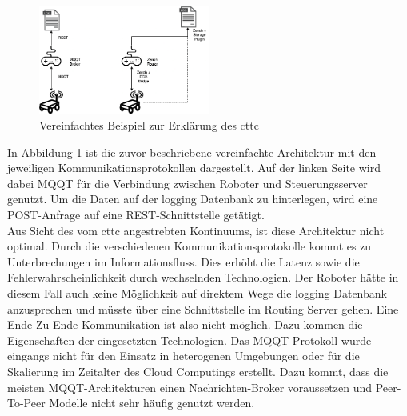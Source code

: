 \begin{figure}
  \begin{center}
    \includegraphics[width=0.5\textwidth]{./figures/cttc_demo.png}
  \end{center}
  \caption{Vereinfachtes Beispiel zur Erklärung des \acrlong{cttc}}
  \label{fig:cttc_demo}
\end{figure}

In Abbildung \ref{fig:cttc_demo} ist die zuvor beschriebene vereinfachte Architektur mit den jeweiligen Kommunikationsprotokollen dargestellt. Auf der linken Seite wird dabei MQQT für die Verbindung zwischen Roboter und Steuerungsserver genutzt. Um die Daten auf der logging Datenbank zu hinterlegen, wird eine POST-Anfrage auf eine REST-Schnittstelle getätigt.\\
Aus Sicht des vom \acrlong{cttc} angestrebten Kontinuums, ist diese Architektur nicht optimal. Durch die verschiedenen Kommunikationsprotokolle kommt es zu Unterbrechungen im Informationsfluss. Dies erhöht die Latenz sowie die Fehlerwahrscheinlichkeit durch wechselnden Technologien. Der Roboter hätte in diesem Fall auch keine Möglichkeit auf direktem Wege die logging Datenbank anzusprechen und müsste über eine Schnittstelle im Routing Server gehen. Eine Ende-Zu-Ende Kommunikation ist also nicht möglich. Dazu kommen die Eigenschaften der eingesetzten Technologien. Das MQQT-Protokoll \cite{enwiki:1127334174} wurde eingangs nicht für den Einsatz in heterogenen Umgebungen oder für die Skalierung im Zeitalter des Cloud Computings erstellt. Dazu kommt, dass die meisten MQQT-Architekturen einen Nachrichten-Broker voraussetzen und Peer-To-Peer Modelle nicht sehr häufig genutzt werden.\\

